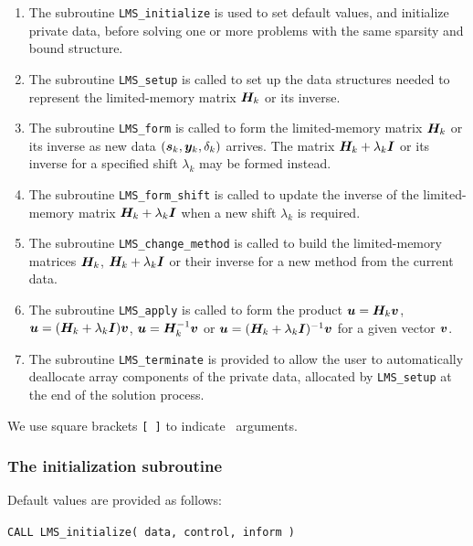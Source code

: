 \documentclass{galahad}
\newcommand{\packagename}{LMS}
\begin{document}
\begin{enumerate}
\item The subroutine
      {\tt \packagename\_initialize}
      is used to set default values, and initialize private data,
      before solving one or more problems with the
      same sparsity and bound structure.
\item The subroutine
      {\tt \packagename\_setup}
      is called to set up the data structures needed to represent
      the limited-memory matrix ${\bm{H}}_k$ or its inverse.
\item The subroutine
      {\tt \packagename\_form}
      is called to form the limited-memory matrix ${\bm{H}}_k$ or its inverse
      as new data $({\bm{s}}_k,{\bm{y}}_k,\delta_k)$ arrives. The matrix
      ${\bm{H}}_k+ \lambda_k{\bm{I}}$ or its inverse for a specified shift
      $\lambda_k$ may be formed instead.
\item The subroutine
      {\tt \packagename\_form\_shift}
      is called to update the inverse of the
      limited-memory matrix ${\bm{H}}_k+ \lambda_k{\bm{I}}$
      when a new shift $\lambda_k$ is required.
\item The subroutine
      {\tt \packagename\_change\_method}
      is called to build the limited-memory matrices ${\bm{H}}_k$,
      ${\bm{H}}_k+ \lambda_k{\bm{I}}$ or their inverse
      for a new method from the current data.
\item The subroutine
      {\tt \packagename\_apply}
      is called to form the product ${\bm{u}} = {\bm{H}}_k {\bm{v}}$,
      ${\bm{u}} = ( {\bm{H}}_k + \lambda_k {\bm{I}} ) {\bm{v}}$,
      ${\bm{u}} = {\bm{H}}_k^{-1} {\bm{v}}$ or
      ${\bm{u}} = ( {\bm{H}}_k + \lambda_k {\bm{I}}) ^{-1} {\bm{v}}$ for a given vector ${\bm{v}}$.
\item The subroutine
      {\tt \packagename\_terminate}
      is provided to allow the user to automatically deallocate array
       components of the private data, allocated by
       {\tt \packagename\_setup}
       at the end of the solution process.
\end{enumerate}
We use square brackets {\tt [ ]} to indicate \optional\ arguments.


\subsubsection{The initialization subroutine}\label{subinit}
 Default values are provided as follows:
\vspace*{1mm}

\hspace{8mm}
{\tt CALL \packagename\_initialize( data, control, inform )}
\end{document}
